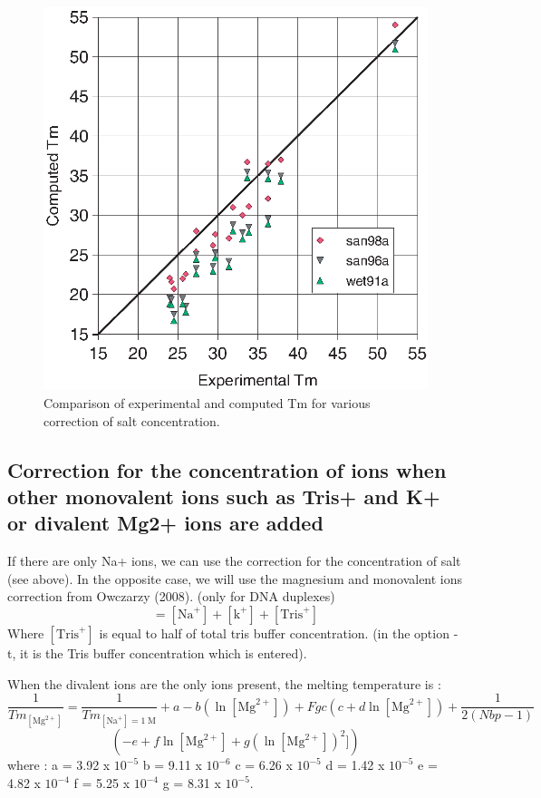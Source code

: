 \documentclass{article}
\begin{document}
\begin{figure}[h]
\includegraphics{salt.eps}
\caption{Comparison of experimental and computed Tm for various correction
of salt concentration.}
\end{figure}

\subsection{Correction for the concentration of ions when other monovalent ions such as 
Tris+ and K+ or divalent Mg2+ ions are added}  

If there are only Na+ ions, we can use the correction for the concentration of salt
(see above). In the opposite case, we will use the magnesium and monovalent ions correction
from Owczarzy (2008). (only for DNA duplexes)
\begin{displaymath}
 [\mbox{Mon}^+] = [\mbox{Na}^+] + [\mbox{k}^+] + [\mbox{Tris}^+]
\end{displaymath}
  Where $[\mbox{Tris}^+]$ is equal to half of total tris buffer concentration. (in the option -t, it is the Tris buffer concentration
which is entered).

When the divalent ions are the only ions present, the melting temperature is :
\begin{displaymath}
\frac{1}{Tm_{[\mbox{Mg}^{2+}]}} = \frac{1}{Tm_{[\mbox{Na}^+]=1\;\mathrm{M}}} + a
- b (\ln [\mbox{Mg}^{2+}]) + Fgc (c + d \ln [\mbox{Mg}^{2+}]) + \frac{1}{2 (Nbp-1)} 
\end{displaymath}
\begin{displaymath}
(-e + f \ln [\mbox{Mg}^{2+}] + g (\ln [\mbox{Mg}^{2+}])^{2}])
\end{displaymath}
   where : 
a = 3.92 x $10^{-5}$
b = 9.11 x $10^{-6}$
c = 6.26 x $10^{-5}$
d = 1.42 x $10^{-5}$
e = 4.82 x $10^{-4}$
f = 5.25 x $10^{-4}$
g = 8.31 x $10^{-5}$.
\end{document}

